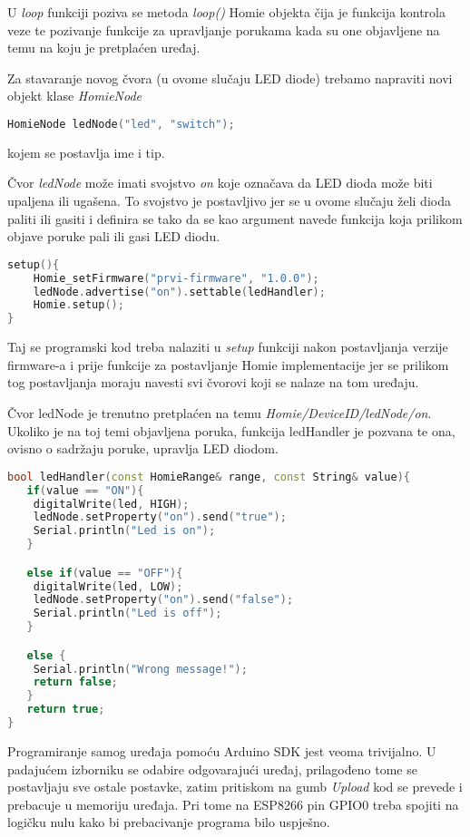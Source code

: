\documentclass[times, utf8, zavrsni]{fer}
\begin{document}
{U \textit{loop} funkciji poziva se metoda \textit{loop()} Homie objekta čija je funkcija kontrola veze te pozivanje funkcije za upravljanje porukama kada su one objavljene na temu na koju je pretplaćen uređaj.

Za stavaranje novog čvora (u ovome slučaju LED diode) trebamo napraviti novi objekt klase \textit{HomieNode}
\begin{lstlisting}[language=c++]
HomieNode ledNode("led", "switch");
\end{lstlisting}
kojem se postavlja ime i tip.

Čvor \textit{ledNode} može imati svojstvo \textit{on} koje označava da LED dioda može biti upaljena ili ugašena.
To svojstvo je postavljivo jer se u ovome slučaju želi dioda paliti ili gasiti i definira se tako da se kao argument navede funkcija koja prilikom objave poruke pali ili gasi LED diodu.
\begin{lstlisting}[language=c++]
setup(){
    Homie_setFirmware("prvi-firmware", "1.0.0");
    ledNode.advertise("on").settable(ledHandler);
    Homie.setup();
}
\end{lstlisting}

Taj se programski kod treba nalaziti u \textit{setup} funkciji nakon postavljanja verzije firmware-a i prije funkcije za postavljanje Homie implementacije jer se prilikom tog postavljanja moraju navesti svi čvorovi koji se nalaze na tom uređaju.

Čvor ledNode je trenutno pretplaćen na temu \textit{Homie/DeviceID/ledNode/on}.
Ukoliko je na toj temi objavljena poruka, funkcija ledHandler je pozvana te ona, ovisno o sadržaju poruke, upravlja LED diodom.
\begin{lstlisting}[language=C++]
bool ledHandler(const HomieRange& range, const String& value){
   if(value == "ON"){
    digitalWrite(led, HIGH);
    ledNode.setProperty("on").send("true");
    Serial.println("Led is on");
   }

   else if(value == "OFF"){
    digitalWrite(led, LOW);
    ledNode.setProperty("on").send("false");
    Serial.println("Led is off");
   }

   else {
    Serial.println("Wrong message!");
    return false;
   }
   return true;
}
\end{lstlisting}

Programiranje samog uređaja pomoću Arduino SDK jest veoma trivijalno.
U padajućem izborniku se odabire odgovarajući uređaj, prilagođeno tome se postavljaju sve ostale postavke, zatim pritiskom na gumb \textit{Upload} kod se prevede i prebacuje u memoriju uređaja.
Pri tome na ESP8266 pin GPIO0 treba spojiti na logičku nulu kako bi prebacivanje programa bilo uspješno.

}
\end{document}
